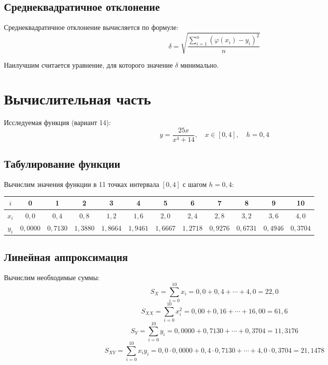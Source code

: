 \subsection{Среднеквадратичное отклонение}

Среднеквадратичное отклонение вычисляется по формуле:
\[
\delta = \sqrt{\frac{\sum_{i=1}^{n} (\varphi(x_i) - y_i)^2}{n}}
\]

Наилучшим считается уравнение, для которого значение $\delta$ минимально.

\section{Вычислительная часть}

Исследуемая функция (вариант 14):
\[
y = \frac{25x}{x^4 + 14},\quad x \in [0,4],\quad h = 0{,}4
\]

\subsection{Табулирование функции}

Вычислим значения функции в 11 точках интервала $[0, 4]$ с шагом $h = 0{,}4$:

\begin{table}[h!]
\centering
\label{tab:table}
\renewcommand{\arraystretch}{1.5}
\begin{tabular}{|c|c|c|c|c|c|c|c|c|c|c|c|}
\hline
$i$ & 0 & 1 & 2 & 3 & 4 & 5 & 6 & 7 & 8 & 9 & 10 \\
\hline
$x_i$ & $0{,}0$ & $0{,}4$ & $0{,}8$ & $1{,}2$ & $1{,}6$ & $2{,}0$ & $2{,}4$ & $2{,}8$ & $3{,}2$ & $3{,}6$ & $4{,}0$ \\
\hline
$y_i$ & $0{,}0000$ & $0{,}7130$ & $1{,}3880$ & $1{,}8664$ & $1{,}9461$ & $1{,}6667$ & $1{,}2718$ & $0{,}9276$ & $0{,}6731$ & $0{,}4946$ & $0{,}3704$ \\
\hline
\end{tabular}
\end{table}

\subsection{Линейная аппроксимация}

Вычислим необходимые суммы:
\[
S_X = \sum_{i=0}^{10} x_i = 0{,}0 + 0{,}4 + \cdots + 4{,}0 = 22{,}0
\]
\[
S_{XX} = \sum_{i=0}^{10} x_i^2 = 0{,}00 + 0{,}16 + \cdots + 16{,}00 = 61{,}6
\]
\[
S_Y = \sum_{i=0}^{10} y_i = 0{,}0000 + 0{,}7130 + \cdots + 0{,}3704 = 11{,}3176
\]
\[
S_{XY} = \sum_{i=0}^{10} x_i y_i = 0{,}0\cdot 0{,}0000 + 0{,}4\cdot 0{,}7130 + \cdots + 4{,}0\cdot 0{,}3704 = 21{,}1478
\]

